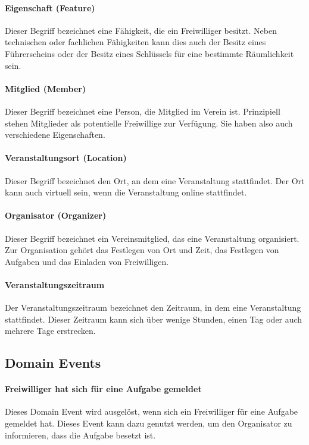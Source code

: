 \paragraph{\glqq Eigenschaft\grqq{} (Feature)}
Dieser Begriff bezeichnet eine Fähigkeit, die ein Freiwilliger besitzt. Neben technischen oder fachlichen Fähigkeiten kann dies auch der Besitz eines Führerscheins oder der Besitz eines Schlüssels für eine bestimmte Räumlichkeit sein.

\paragraph{\glqq Mitglied\grqq{} (Member)}
Dieser Begriff bezeichnet eine Person, die Mitglied im Verein ist. Prinzipiell stehen Mitglieder als potentielle Freiwillige zur Verfügung. Sie haben also auch verschiedene Eigenschaften.

\paragraph{\glqq Veranstaltungsort\grqq{} (Location)}
Dieser Begriff bezeichnet den Ort, an dem eine Veranstaltung stattfindet. Der Ort kann auch \glqq virtuell\grqq{} sein, wenn die Veranstaltung online stattfindet.

\paragraph{\glqq Organisator\grqq{} (Organizer)}
Dieser Begriff bezeichnet ein Vereinsmitglied, das eine Veranstaltung organisiert. Zur Organisation gehört das Festlegen von Ort und Zeit, das Festlegen von Aufgaben und das Einladen von Freiwilligen.

\paragraph{Veranstaltungszeitraum}
Der Veranstaltungszeitraum bezeichnet den Zeitraum, in dem eine Veranstaltung stattfindet.
Dieser Zeitraum kann sich über wenige Stunden, einen Tag oder auch mehrere Tage erstrecken.

\subsection{Domain Events}

\paragraph{\glqq Freiwilliger hat sich für eine Aufgabe gemeldet\grqq}
Dieses Domain Event wird ausgelöst, wenn sich ein Freiwilliger für eine Aufgabe gemeldet hat. Dieses Event kann dazu genutzt werden, um den Organisator zu informieren, dass die Aufgabe besetzt ist.

